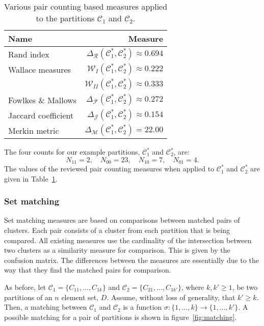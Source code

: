 \documentclass[a4paper]{report}
\newcommand{\dset}{D}
\newcommand{\clus}{\mathcal{C}}
\newcommand{\partcomparest}[1]{\Delta_{\mathcal{#1}}(\clus^*_1,\clus^*_2)}
\begin{document}
\begin{table}
  \centering
  \begin{tabular}{lr}
    \toprule
    Name & Measure \\
    \midrule
    Rand index          & $\partcomparest{R} \approx 0.694$ \\
    Wallace measures    & $\mathcal{W}_{I}(\clus^*_1,\clus^*_2) \approx 0.222$ \\
                        & $\mathcal{W}_{II}(\clus^*_1,\clus^*_2) \approx 0.333$ \\
    Fowlkes \& Mallows  & $\partcomparest{F} \approx 0.272$ \\
    Jaccard coefficient & $\partcomparest{J} \approx 0.154$ \\
    Merkin metric       & $\partcomparest{M} = 22.00$ \\
    \bottomrule
  \end{tabular}
  \caption{Various pair counting based measures applied to the partitions
    $\clus_1$ and $\clus_2$.}
  \label{tab:pair-counting-comparison}
\end{table}

The four counts for our example partitions, $\clus^*_1$ and $\clus^*_2$, are:
\begin{equation*}
  N_{11} = 2,\quad
  N_{00} = 23,\quad
  N_{10} = 7,\quad
  N_{01} = 4.
\end{equation*}
The values of the reviewed pair counting measures when applied to $\clus^*_1$
and $\clus^*_2$ are given in Table~\ref{tab:pair-counting-comparison}.

\subsubsection{Set matching}
\label{sec:set-matching}

Set matching measures are based on comparisons between matched pairs of
clusters.  Each pair consists of a cluster from each partition that is being
compared.  All existing measures use the cardinality of the intersection
between two clusters as a similarity measure for comparison.  This is given by
the confusion matrix.  The differences between the measures are essentially
due to the way that they find the matched pairs for comparison.

As before, let $\clus_1 = \{C_{11},\dotsc,C_{1k}\}$ and $\clus_2 =
\{C_{21},\dotsc,C_{1k'}\}$, where $k,k' \geq 1$, be two partitions of an $n$
element set, $\dset$.  Assume, without loss of generality, that $k' \geq k$.
Then, a matching between $\clus_1$ and $\clus_2$ is a function $\sigma \colon
\{1,\dotsc,k\} \to \{1,\dotsc,k'\}$.  A possible matching for a pair of
partitions is shown in figure~\ref{fig:matching}.
\end{document}
